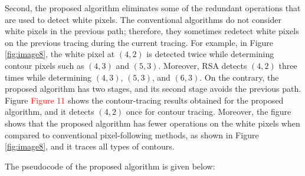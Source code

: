 
Second, the proposed algorithm eliminates some of the redundant operations that are used to detect white pixels. The conventional algorithms do not consider white pixels in the previous path; therefore, they sometimes redetect white pixels on the previous tracing during the current tracing. For example, in Figure \ref{fig:image8}, the white pixel at $(4, 2)$ is detected twice while determining contour pixels such as $(4, 3)$ and $(5, 3)$. Moreover, RSA detects $(4, 2)$ three times while determining $(4, 3)$, $(5, 3)$, and $(6, 3)$. On the contrary, the proposed algorithm has two stages, and its second stage avoids the previous path. Figure \textcolor{red}{Figure 11} shows the contour-tracing results obtained for the proposed algorithm, and it detects $(4, 2)$ once for contour tracing. Moreover, the figure shows that the proposed algorithm has fewer operations on the white pixels when compared to conventional pixel-following methods, as shown in Figure \ref{fig:image8}, and it traces all types of contours. 


The pseudocode of the proposed algorithm is given below: 

